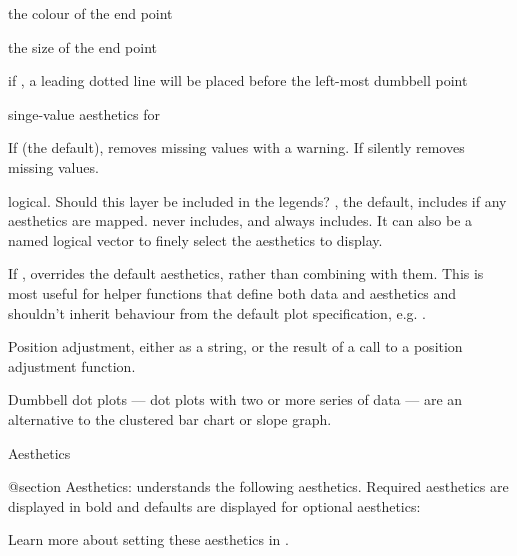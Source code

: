 \documentclass[a4paper]{book}
\begin{document}
\begin{Arguments}
\begin{ldescription}
\item[\code{colour\_xend}] the colour of the end point

\item[\code{size\_xend}] the size of the end point

\item[\code{dot\_guide}] if , a leading dotted line will be placed before the left-most dumbbell point

\item[\code{dot\_guide\_size}, \code{dot\_guide\_colour}] singe-value aesthetics for 

\item[\code{na.rm}] If  (the default), removes missing values with
a warning.  If  silently removes missing values.

\item[\code{show.legend}] logical. Should this layer be included in the legends?
, the default, includes if any aesthetics are mapped.
 never includes, and  always includes.
It can also be a named logical vector to finely select the aesthetics to
display.

\item[\code{inherit.aes}] If , overrides the default aesthetics,
rather than combining with them. This is most useful for helper functions
that define both data and aesthetics and shouldn't inherit behaviour from
the default plot specification, e.g. .

\item[\code{position}] Position adjustment, either as a string, or the result of a
call to a position adjustment function.
\end{ldescription}
\end{Arguments}
%
\begin{Details}
Dumbbell dot plots — dot plots with two or more series of data — are an
alternative to the clustered bar chart or slope graph.
\end{Details}
%
\begin{Section}{Aesthetics}

@section Aesthetics:
understands the following aesthetics. Required aesthetics are displayed in bold and defaults are displayed for optional aesthetics:

Learn more about setting these aesthetics in .
\end{Section}
\end{document}
